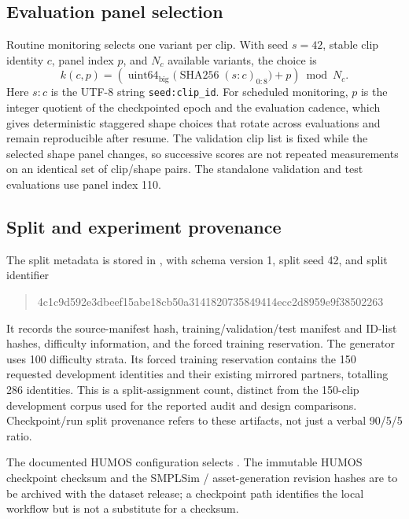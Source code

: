 \subsection{Evaluation panel selection}\label{app:panel}

Routine monitoring selects one variant per clip. With seed $s=42$, stable clip
identity $c$, panel index $p$, and $N_c$ available variants, the choice is
\begin{equation}
    k(c,p) =
    \left(
       \operatorname{uint64}_{\mathrm{big}}
       \bigl(\operatorname{SHA256}(s\!:\!c)_{0:8}\bigr)
       +p
    \right)\bmod N_c .
    \label{eq:shape_panel}
\end{equation}
Here $s\!:\!c$ is the UTF-8 string \texttt{seed:clip\_id}. For scheduled
monitoring, $p$ is the integer quotient of the checkpointed epoch and the
evaluation cadence, which gives deterministic staggered shape choices that
rotate across evaluations and remain reproducible after resume. The validation
clip list is fixed while the selected shape panel changes, so successive scores
are not repeated measurements on an identical set of clip/shape pairs. The
standalone validation and test evaluations use panel index 110.

\subsection{Split and experiment provenance}\label{app:provenance}

The split metadata is stored in
, with schema version 1,
split seed 42, and split identifier
\begin{quote}
\footnotesize\ttfamily
4c1c9d592e3dbeef15abe18cb50a3141820735849414ecc2d8959e9f38502263
\end{quote}
It records the source-manifest hash, training/validation/test manifest and
ID-list hashes, difficulty information, and the forced training reservation.
The generator uses 100 difficulty strata. Its forced training reservation
contains the 150 requested development identities and their existing mirrored
partners, totalling 286 identities. This is a split-assignment count, distinct
from the 150-clip development corpus used for the reported audit and design
comparisons. Checkpoint/run split provenance refers to these artifacts,
not just a verbal 90/5/5 ratio.

The documented HUMOS configuration selects
. The immutable
HUMOS checkpoint checksum and the SMPLSim / asset-generation revision hashes
are to be archived with the dataset release; a checkpoint path identifies the
local workflow but is not a substitute for a checksum.


